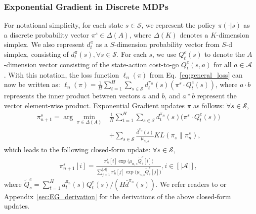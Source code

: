 \documentclass{article}
\newcommand{\BB}[1]{\textcolor{red}{\bf Byron: {#1}}}
\begin{document}
\subsubsection{Exponential Gradient in Discrete MDPs}
For notational simplicity, for each state $s\in\mathcal{S}$, we represent the policy $\pi(\cdot |s)$ as a discrete probability vector $\pi^s \in \Delta(A)$, where $\Delta(K)$ denotes a $K$-dimension simplex. We also represent $d_t^{\pi}$ as a ${S}$-dimension probability vector from $S$-d simplex, consisting of $d_t^{\pi}(s), \forall s\in\mathcal{S}$. 
For each $s$, we use $Q^e_t(s)$ to denote the $A$-dimension vector consisting of the state-action cost-to-go $Q^e_t(s,a)$ for all $a\in\mathcal{A}$. With this notation, the loss function $\ell_n(\pi)$ from Eq.~\ref{eq:general_loss} can now be written as: $\ell_n(\pi) = \frac{1}{H}\sum_{t=1}^H \sum_{s\in\mathcal{S}} d_t^{\pi_n}(s)( \pi^s\cdot Q^e_t(s))$,
where $a\cdot b$ represents the inner product between vectors $a$ and $b$, and $a*b$ represent the vector element-wise product. Exponential Gradient updates $\pi$ as follows: $\forall s\in\mathcal{S}$,
\begin{align}
\label{eq:eg_argmax}
\pi^s_{n+1} = \arg\min_{\pi\in\Delta(A)}&\frac{1}{H}\sum_{t=1}^H \sum_{s\in\mathcal{S}} d_t^{\pi_n}(s)\big( \pi^s\cdot Q^e_t(s)\big) \nonumber \\ &+\sum_{s\in\mathcal{S}}\frac{\bar{d}^{\pi_n}(s)}{\mu_{n,s}}KL(\pi_s \| \pi^s_n), 
\end{align} 
which leads to the following closed-form update: $\forall s\in\mathcal{S}$,
\begin{align}
\label{eq:eg_closed_form}
\pi_{n+1}^s[i] = \frac{\pi_n^s[i]\exp\big(\mu_{n,s} \tilde{Q}_s^e[i]\big)}{\sum_{j=1}^{|\mathcal{A}|}\pi_n^s[j]\exp\big(\mu_{n,s} \tilde{Q}_s^e[j]\big)}, i\in [|\mathcal{A}|],
\end{align} where $\tilde{Q}_s^e = \sum_{t=1}^H d_t^{\pi_n}(s)Q^e_t(s) / (H\bar{d}^{\pi_n}(s))$. We refer readers to \cite{shalev2012online} or Appendix~\ref{sec:EG_derivation} for the derivations of the above closed-form updates. 
\end{document}

